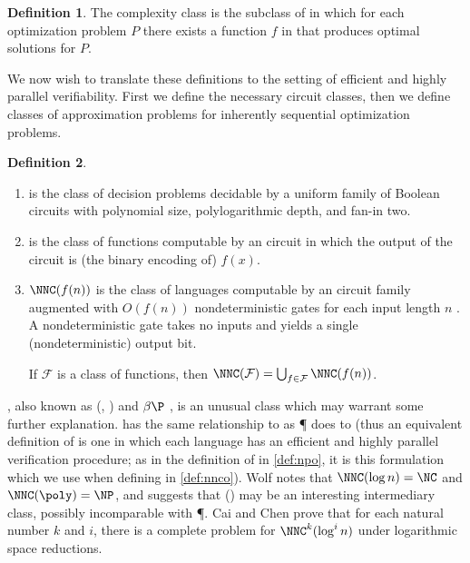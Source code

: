 \documentclass[]{article}
\theoremstyle{plain}
\theoremstyle{definition}
\newtheorem{definition}{Definition}
\begin{document}
\begin{definition}
  The complexity class \PO{} is the subclass of \NPO{} in which for each optimization problem $P$ there exists a function $f$ in \FP{} that produces optimal solutions for $P$.
\end{definition}

We now wish to translate these definitions to the setting of efficient and highly parallel verifiability.
First we define the necessary circuit classes, then we define classes of approximation problems for inherently sequential optimization problems.

\begin{definition}
  \mbox{}
  \begin{enumerate}
  \item \NC{} is the class of decision problems decidable by a uniform family of Boolean circuits with polynomial size, polylogarithmic depth, and fan-in two.
  \item \FNC{} is the class of functions computable by an \NC{} circuit in which the output of the circuit is (the binary encoding of) $f(x)$.
  \item $\NNC(f(n))$ is the class of languages computable by an \NC{} circuit family augmented with $O(f(n))$ nondeterministic gates for each input length $n$ \cite{wolf94}.
    A nondeterministic gate takes no inputs and yields a single (nondeterministic) output bit.

    If $\mathcal{F}$ is a class of functions, then $\NNC(\mathcal{F})=\bigcup_{f\in\mathcal{F}}{\NNC(f(n))}$.
  \end{enumerate}
\end{definition}

\NNCpoly, also known as \GC(\poly, \NC) \cite{cc97} and $\beta\P$ \cite{kf80}, is an unusual class which may warrant some further explanation.
\NC{} has the same relationship to \NNCpoly{} as \P{} does to \NP{} (thus an equivalent definition of \NNCpoly{} is one in which each language has an efficient and highly parallel verification procedure; as in the definition of \NPO{} in \autoref{def:npo}, it is this formulation which we use when defining \NNCO{} in \autoref{def:nnco}).
Wolf \cite{wolf94} notes that $\NNC(\log n)=\NC$ and $\NNC(\poly)=\NP$, and suggests that \NNC(\polylog) may be an interesting intermediary class, possibly incomparable with \P.
Cai and Chen \cite{cc97} prove that for each natural number $k$ and $i$, there is a complete problem for $\NNC^k(\log^i n)$ under logarithmic space reductions.
\end{document}
